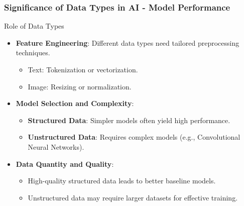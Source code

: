\documentclass[aspectratio=169]{beamer}
\begin{document}
\begin{frame}[fragile]
    \frametitle{Significance of Data Types in AI - Model Performance}
    \begin{block}{Role of Data Types}
        \begin{itemize}
            \item \textbf{Feature Engineering}: Different data types need tailored preprocessing techniques.
            \begin{itemize}
                \item Text: Tokenization or vectorization.
                \item Image: Resizing or normalization.
            \end{itemize}
            
            \item \textbf{Model Selection and Complexity}:
            \begin{itemize}
                \item \textbf{Structured Data}: Simpler models often yield high performance.
                \item \textbf{Unstructured Data}: Requires complex models (e.g., Convolutional Neural Networks).
            \end{itemize}

            \item \textbf{Data Quantity and Quality}:
            \begin{itemize}
                \item High-quality structured data leads to better baseline models.
                \item Unstructured data may require larger datasets for effective training.
            \end{itemize}
        \end{itemize}
    \end{block}
\end{frame}
\end{document}

